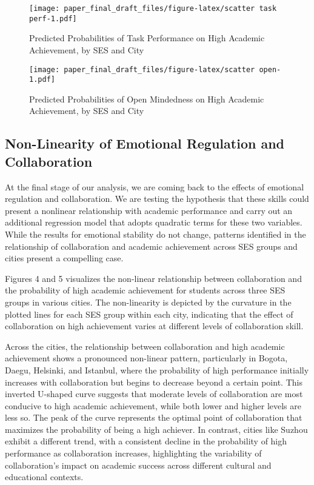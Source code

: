 \documentclass[
  12pt,
  a4paper,
]{article}
\begin{document}
\begin{figure}
\centering
\texttt{[image: paper\_final\_draft\_files/figure-latex/scatter task perf-1.pdf]}
\caption{Predicted Probabilities of Task Performance on High Academic
Achievement, by SES and City}
\end{figure}

\begin{figure}
\centering
\texttt{[image: paper\_final\_draft\_files/figure-latex/scatter open-1.pdf]}
\caption{Predicted Probabilities of Open Mindedness on High Academic
Achievement, by SES and City}
\end{figure}

\hypertarget{non-linearity-of-emotional-regulation-and-collaboration}{%
\subsection{Non-Linearity of Emotional Regulation and
Collaboration}\label{non-linearity-of-emotional-regulation-and-collaboration}}

At the final stage of our analysis, we are coming back to the effects of
emotional regulation and collaboration. We are testing the hypothesis
that these skills could present a nonlinear relationship with academic
performance and carry out an additional regression model that adopts
quadratic terms for these two variables. While the results for emotional
stability do not change, patterns identified in the relationship of
collaboration and academic achievement across SES groups and cities
present a compelling case.

Figures 4 and 5 visualizes the non-linear relationship between
collaboration and the probability of high academic achievement for
students across three SES groups in various cities. The non-linearity is
depicted by the curvature in the plotted lines for each SES group within
each city, indicating that the effect of collaboration on high
achievement varies at different levels of collaboration skill.

Across the cities, the relationship between collaboration and high
academic achievement shows a pronounced non-linear pattern, particularly
in Bogota, Daegu, Helsinki, and Istanbul, where the probability of high
performance initially increases with collaboration but begins to
decrease beyond a certain point. This inverted U-shaped curve suggests
that moderate levels of collaboration are most conducive to high
academic achievement, while both lower and higher levels are less so.
The peak of the curve represents the optimal point of collaboration that
maximizes the probability of being a high achiever. In contrast, cities
like Suzhou exhibit a different trend, with a consistent decline in the
probability of high performance as collaboration increases, highlighting
the variability of collaboration's impact on academic success across
different cultural and educational contexts.
\end{document}

